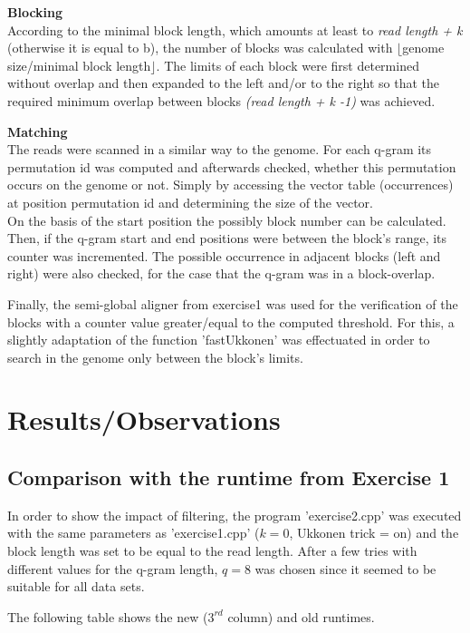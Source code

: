 \documentclass[11pt, notitlepage]{scrartcl}
\begin{document}
\textbf{Blocking}\\
According to the minimal block length, which amounts at least to \textit{read length + k} (otherwise it is equal to b), the number of blocks was calculated with $\lfloor$genome size/minimal block length$\rfloor$. The limits of each block were first determined without overlap and then expanded to the left and/or to the right so that the required minimum overlap between blocks \textit{(read length + k -1)} was achieved.

\textbf{Matching}\\
The reads were scanned in a similar way to the genome. For each q-gram its permutation id was computed and afterwards checked, whether this permutation occurs on the genome or not. Simply by accessing the vector table (occurrences) at position permutation id and determining the size of the vector.\\
On the basis of the start position the possibly block number can be calculated. Then, if the q-gram start and end positions were between the block's range, its counter was incremented. The possible occurrence in adjacent blocks (left and right) were also checked, for the case that the q-gram was in a block-overlap.

Finally, the semi-global aligner from exercise1 was used for the verification of the blocks with a counter value greater/equal to the computed threshold. For this, a slightly adaptation of the function 'fastUkkonen' was effectuated in order to search in the genome only between the block's limits. 

\section{Results/Observations}
\subsection{Comparison with the runtime from Exercise 1}
In order to show the impact of filtering, the program 'exercise2.cpp' was executed with the same parameters as 'exercise1.cpp' ($k=0$, Ukkonen trick = on) and the block length was set to be equal to the read length. After a few tries with different values for the q-gram length, $q=8$ was chosen since it seemed to be suitable for all data sets.

The following table shows the new  ($3^{rd}$ column) and old runtimes.
\end{document}

